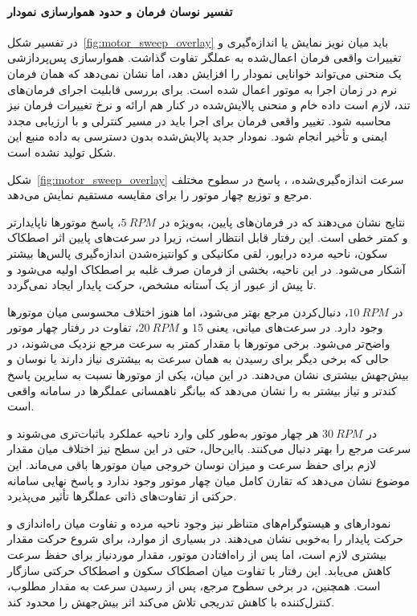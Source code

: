 \paragraph{تفسیر نوسان فرمان و حدود هموارسازی نمودار}
در تفسیر شکل~\ref{fig:motor_sweep_overlay} باید میان نویز نمایش یا اندازه‌گیری و تغییرات واقعی فرمان اعمال‌شده به عملگر تفاوت گذاشت. هموارسازی پس‌پردازشی یک منحنی می‌تواند خوانایی نمودار را افزایش دهد، اما نشان نمی‌دهد که همان فرمان نرم در زمان اجرا به موتور اعمال شده است. برای بررسی قابلیت اجرای فرمان‌های تند، لازم است داده خام و منحنی پالایش‌شده در کنار هم ارائه و نرخ تغییرات فرمان نیز محاسبه شود. تغییر واقعی فرمان برای اجرا باید در مسیر کنترلی و با ارزیابی مجدد ایمنی و تأخیر انجام شود. نمودار جدید پالایش‌شده بدون دسترسی به داده منبع این شکل تولید نشده است.

شکل~\ref{fig:motor_sweep_overlay} سرعت اندازه‌گیری‌شده، ، پاسخ در سطوح مختلف مرجع و توزیع  چهار موتور را برای مقایسه مستقیم نمایش می‌دهد.

نتایج نشان می‌دهند که در فرمان‌های پایین، به‌ویژه در $5~RPM$، پاسخ موتورها ناپایدارتر و کمتر خطی است. این رفتار قابل انتظار است، زیرا در سرعت‌های پایین اثر اصطکاک سکون، ناحیه مرده درایور، لقی مکانیکی و کوانتیزه‌شدن اندازه‌گیری پالس‌ها بیشتر آشکار می‌شود. در این ناحیه، بخشی از فرمان  صرف غلبه بر اصطکاک اولیه می‌شود و تا پیش از عبور از یک آستانه مشخص، حرکت پایدار ایجاد نمی‌گردد.

در $10~RPM$، دنبال‌کردن مرجع بهتر می‌شود، اما هنوز اختلاف محسوسی میان موتورها وجود دارد. در سرعت‌های میانی، یعنی $15$ و $20~RPM$، تفاوت در رفتار چهار موتور واضح‌تر می‌شود. برخی موتورها با مقدار  کمتر به سرعت مرجع نزدیک می‌شوند، در حالی که برخی دیگر برای رسیدن به همان سرعت به  بیشتری نیاز دارند یا نوسان و بیش‌جهش بیشتری نشان می‌دهند. در این میان، یکی از موتورها نسبت به سایرین پاسخ کندتر و نیاز بیشتر به  را نشان می‌دهد که بیانگر ناهمسانی عملگرها در سامانه واقعی است.

در $30~RPM$ هر چهار موتور به‌طور کلی وارد ناحیه عملکرد باثبات‌تری می‌شوند و سرعت مرجع را بهتر دنبال می‌کنند. بااین‌حال، حتی در این سطح نیز اختلاف میان مقدار  لازم برای حفظ سرعت و میزان نوسان خروجی میان موتورها باقی می‌ماند. این موضوع نشان می‌دهد که تقارن کامل میان چهار موتور وجود ندارد و پاسخ نهایی سامانه حرکتی از تفاوت‌های ذاتی عملگرها تأثیر می‌پذیرد.

نمودارهای  و هیستوگرام‌های متناظر نیز وجود ناحیه مرده و تفاوت میان راه‌اندازی و حرکت پایدار را به‌خوبی نشان می‌دهند. در بسیاری از موارد، برای شروع حرکت مقدار  بیشتری لازم است، اما پس از راه‌افتادن موتور، مقدار  موردنیاز برای حفظ سرعت کاهش می‌یابد. این رفتار با تفاوت میان اصطکاک سکون و اصطکاک حرکتی سازگار است. همچنین، در برخی سطوح مرجع، پس از رسیدن سرعت به مقدار مطلوب، کنترل‌کننده با کاهش تدریجی  تلاش می‌کند اثر بیش‌جهش را محدود کند.

